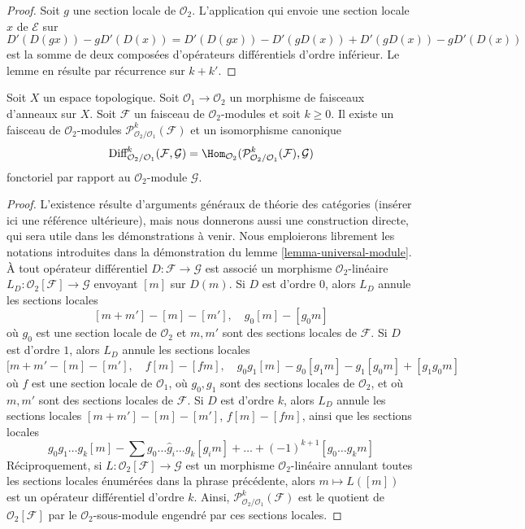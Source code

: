 \begin{proof}
Soit $g$ une section locale de $\mathcal{O}_2$. L'application qui envoie une
section locale $x$ de $\mathcal{E}$ sur
$$
D'(D(gx)) - gD'(D(x)) = D'(D(gx)) - D'(gD(x)) + D'(gD(x)) - gD'(D(x))
$$
est la somme de deux composées d'opérateurs différentiels d'ordre inférieur.
Le lemme en résulte par récurrence sur $k + k'$.
\end{proof}

\begin{lemma}
\label{lemma-module-principal-parts}
Soit $X$ un espace topologique. Soit
$\mathcal{O}_1 \to \mathcal{O}_2$ un morphisme de faisceaux d'anneaux sur
$X$. Soit $\mathcal{F}$ un faisceau de $\mathcal{O}_2$-modules et soit
$k \geq 0$. Il existe un faisceau de $\mathcal{O}_2$-modules
$\mathcal{P}^k_{\mathcal{O}_2/\mathcal{O}_1}(\mathcal{F})$
et un isomorphisme canonique
$$
\text{Diff}^k_{\mathcal{O}_2/\mathcal{O}_1}(\mathcal{F}, \mathcal{G}) =
\Hom_{\mathcal{O}_2}(
\mathcal{P}^k_{\mathcal{O}_2/\mathcal{O}_1}(\mathcal{F}), \mathcal{G})
$$
fonctoriel par rapport au $\mathcal{O}_2$-module $\mathcal{G}$.
\end{lemma}

\begin{proof}
L'existence résulte d'arguments généraux de théorie des catégories
(insérer ici une référence ultérieure), mais nous donnerons aussi une
construction directe, qui sera utile dans les démonstrations à venir. Nous
emploierons librement les notations introduites dans la démonstration du
lemme \ref{lemma-universal-module}. À tout opérateur différentiel
$D : \mathcal{F} \to \mathcal{G}$ est associé un morphisme
$\mathcal{O}_2$-linéaire
$L_D : \mathcal{O}_2[\mathcal{F}] \to \mathcal{G}$
envoyant $[m]$ sur $D(m)$. Si $D$ est d'ordre $0$, alors $L_D$ annule les
sections locales
$$
[m + m'] - [m] - [m'],\quad
g_0[m] - [g_0m]
$$
où $g_0$ est une section locale de $\mathcal{O}_2$ et $m, m'$ sont des
sections locales de $\mathcal{F}$. Si $D$ est d'ordre $1$, alors $L_D$
annule les sections locales
$$
[m + m' - [m] - [m'],\quad
f[m] - [fm], \quad
g_0g_1[m] - g_0[g_1m] - g_1[g_0m] + [g_1g_0m]
$$
où $f$ est une section locale de $\mathcal{O}_1$, où $g_0, g_1$ sont des
sections locales de $\mathcal{O}_2$, et où $m, m'$ sont des sections locales
de $\mathcal{F}$. Si $D$ est d'ordre $k$, alors $L_D$ annule les sections
locales $[m + m'] - [m] - [m']$, $f[m] - [fm]$, ainsi que les sections locales
$$
g_0g_1\ldots g_k[m] - \sum g_0 \ldots \hat g_i \ldots g_k[g_im] + \ldots
+(-1)^{k + 1}[g_0\ldots g_km]
$$
Réciproquement, si $L : \mathcal{O}_2[\mathcal{F}] \to \mathcal{G}$ est un
morphisme $\mathcal{O}_2$-linéaire annulant toutes les sections locales
énumérées dans la phrase précédente, alors $m \mapsto L([m])$ est un
opérateur différentiel d'ordre $k$. Ainsi,
$\mathcal{P}^k_{\mathcal{O}_2/\mathcal{O}_1}(\mathcal{F})$
est le quotient de $\mathcal{O}_2[\mathcal{F}]$ par le
$\mathcal{O}_2$-sous-module engendré par ces sections locales.
\end{proof}

